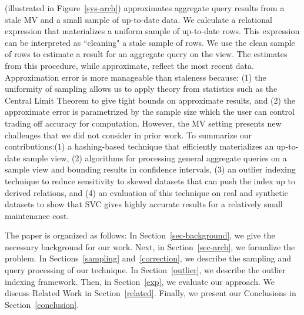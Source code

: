 \svcfull (\svc illustrated in Figure~\ref{sys-arch}) approximates aggregate query results from a stale MV and a small sample of up-to-date data.
We calculate a relational expression that materializes a uniform sample of up-to-date rows.
This expression can be interpreted as ``cleaning" a stale sample of rows.
We use the clean sample of rows to estimate a result for an aggregate query on the view.
The estimates from this procedure, while approximate, reflect the most recent data. 
Approximation error is more manageable than staleness because: (1) the uniformity of sampling allows us to apply theory from statistics such as the Central Limit Theorem to give tight bounds on approximate results, and (2) the approximate error is parametrized by the sample size which the user can control trading off accuracy for computation.
However, the MV setting presents new challenges that we did not consider in prior work.
To summarize our contributions:(1) a hashing-based technique that efficiently materializes an up-to-date sample view, (2) algorithms for processing general aggregate queries on a sample view and bounding results in confidence intervals, (3) an outlier indexing technique to reduce sensitivity to skewed datasets that can push the index up to derived relations, and (4) an evaluation of this technique on real and synthetic datasets to show that SVC gives highly accurate results for a relatively small maintenance cost.

The paper is organized as follows: 
In Section~\ref{sec-background}, we give the necessary background for our work.
Next, in Section~\ref{sec-arch}, we formalize the problem.
In Sections~\ref{sampling} and~\ref{correction}, we describe the sampling and query processing of our technique.
In Section~\ref{outlier}, we describe the outlier indexing framework.
Then, in Section~\ref{exp}, we evaluate our approach.
We discuss Related Work in Section~\ref{related}.
Finally, we present our Conclusions in Section~\ref{conclusion}.
